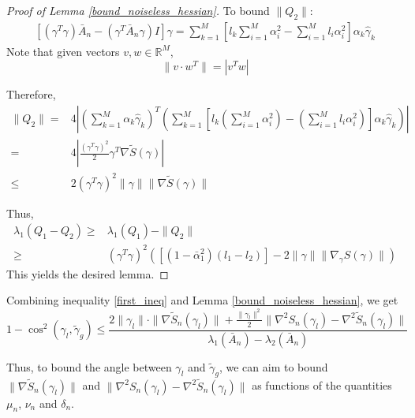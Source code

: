 \documentclass{article} \usepackage{iclr2019_conference,times}
\begin{document}
\begin{proof}[Proof of Lemma \ref{bound_noiseless_hessian}]
To bound $\|Q_2\|$:
\begin{equation}
    \begin{split}
        [(\gamma^T \gamma) \bar{A}_n - (\gamma^T \bar{A}_n \gamma) I] \gamma 
        = \sum_{k=1}^M \left[l_k \sum_{i=1}^M \alpha_i^2 - \sum_{i=1}^M l_i \alpha_i^2\right] \alpha_k \hat{\gamma}_k 
    \end{split}
\end{equation}
Note that given vectors $v, w \in \mathbb{R}^M$, 
\[
\| v \cdot w^T \| = |v^T w|
\]

Therefore, 
\begin{equation}
    \begin{split}
        \|Q_2\| =& 4 \left|\left(\sum_{k=1}^M \alpha_k \hat{\gamma}_k\right)^T \left(\sum_{k=1}^M [l_k(\sum_{i=1}^M \alpha_i^2) - (\sum_{i=1}^M l_i \alpha_i^2)] \alpha_k \hat{\gamma}_k \right)\right| \\
        =& 4 \left|\frac{(\gamma^T \gamma)^2}{2} \gamma^T \nabla \tilde{S}(\gamma)\right| \\
        \leq & 2 (\gamma^T \gamma)^2 \| \gamma \| \| \nabla \tilde{S}(\gamma)\|
    \end{split}
\end{equation}

Thus, 
\begin{equation}
    \begin{split}
        \lambda_{1}(Q_1 - Q_2) \geq& \lambda_{1}(Q_1) - \| Q_2\| \\
        \geq& (\gamma^T \gamma)^2 ([(1 - \bar{\alpha}_1^2) (l_1 - l_2)] - 2 \| \gamma \| \| \nabla_\gamma S(\gamma)\|) \end{split}
\end{equation}
This yields the desired lemma.
\end{proof}

Combining inequality \ref{first_ineq} and Lemma \ref{bound_noiseless_hessian}, we get
\begin{equation}
\label{bound_on_cos}
1-\cos^2(\gamma_l, \tilde{\gamma}_g) \leq \frac{ 2 \| \gamma_l \| \cdot \| \nabla \tilde{S}_n(\gamma_l)\| + \frac{\| \gamma_l \|^2}{2} \|\nabla^2 S_n(\gamma_l) - \nabla^2 \tilde{S}_n(\gamma_l)\|}{\lambda_1(\bar{A}_n)- \lambda_2(\bar{A}_n)}
\end{equation}





Thus, to bound the angle between $\gamma_l$ and $\tilde{\gamma}_g$, we can aim to bound $\| \nabla \tilde{S}_n(\gamma_l)\|$ and $\|\nabla^2 S_n(\gamma_l) - \nabla^2 \tilde{S}_n(\gamma_l)\|$ as functions of the quantities $\mu_n$, $\nu_n$ and $\delta_n$.
\end{document}
